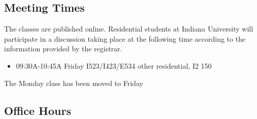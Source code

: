 \subsection{Meeting Times}\label{meeting-times}

The classes are published online. Residential students at Indiana
University will participate in a discussion taking place at the
following time according to the information provided by the registrar.

\begin{itemize}
\tightlist
\item
  09:30A-10:45A Friday I523/I423/E534 other residential, I2 150
\end{itemize}

The Monday class has been moved to Friday

\subsection{Office Hours}\label{office-hours}

